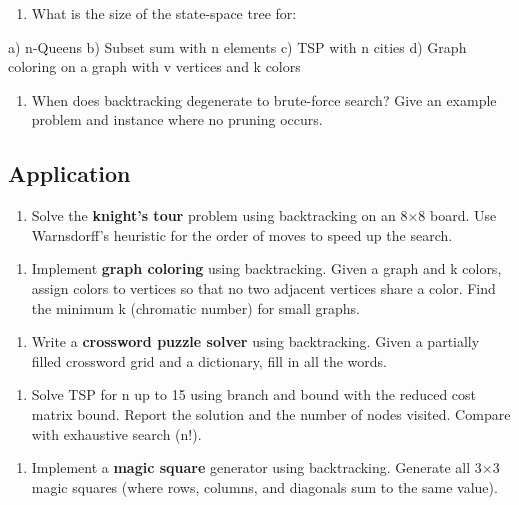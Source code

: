 \begin{enumerate}
\item What is the size of the state-space tree for:
\end{enumerate}
   a) n-Queens
   b) Subset sum with n elements
   c) TSP with n cities
   d) Graph coloring on a graph with v vertices and k colors

\begin{enumerate}
\item When does backtracking degenerate to brute-force search? Give an example problem and instance where no pruning occurs.
\end{enumerate}

\subsection{Application}

\begin{enumerate}
\item Solve the \textbf{knight's tour} problem using backtracking on an 8$\times $8 board. Use Warnsdorff's heuristic for the order of moves to speed up the search.
\end{enumerate}

\begin{enumerate}
\item Implement \textbf{graph coloring} using backtracking. Given a graph and k colors, assign colors to vertices so that no two adjacent vertices share a color. Find the minimum k (chromatic number) for small graphs.
\end{enumerate}

\begin{enumerate}
\item Write a \textbf{crossword puzzle solver} using backtracking. Given a partially filled crossword grid and a dictionary, fill in all the words.
\end{enumerate}

\begin{enumerate}
\item Solve TSP for n up to 15 using branch and bound with the reduced cost matrix bound. Report the solution and the number of nodes visited. Compare with exhaustive search (n!).
\end{enumerate}

\begin{enumerate}
\item Implement a \textbf{magic square} generator using backtracking. Generate all 3$\times $3 magic squares (where rows, columns, and diagonals sum to the same value).
\end{enumerate}


